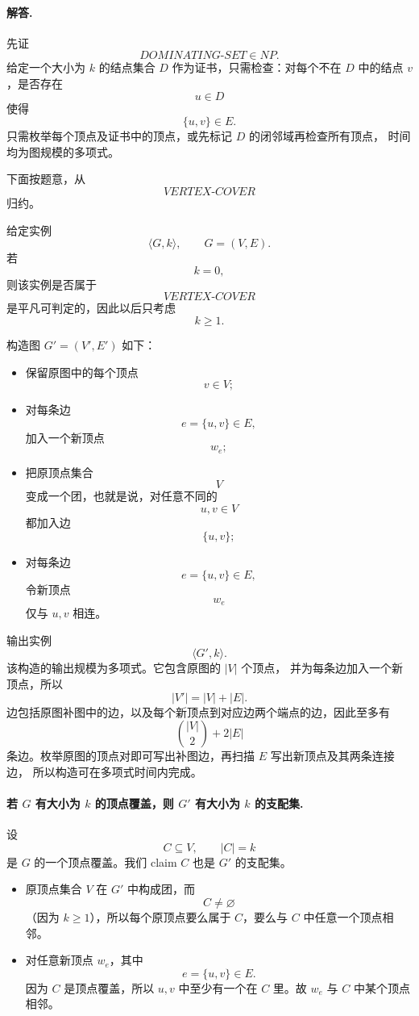 \begin{answerred}
\paragraph{解答.}
先证
\[
DOMINATING\text{-}SET\in NP.
\]
给定一个大小为 $k$ 的结点集合 $D$ 作为证书，只需检查：对每个不在 $D$ 中的结点 $v$，是否存在
\[
u\in D
\]
使得
\[
\{u,v\}\in E.
\]
只需枚举每个顶点及证书中的顶点，或先标记 $D$ 的闭邻域再检查所有顶点，
时间均为图规模的多项式。

\medskip
下面按题意，从
\[
VERTEX\text{-}COVER
\]
归约。

给定实例
\[
\langle G,k\rangle,
\qquad
G=(V,E).
\]
若
\[
k=0,
\]
则该实例是否属于
\[
VERTEX\text{-}COVER
\]
是平凡可判定的，因此以后只考虑
\[
k\ge 1.
\]

\medskip
构造图 $G'=(V',E')$ 如下：

\begin{itemize}
  \item 保留原图中的每个顶点
  \[
  v\in V;
  \]
  \item 对每条边
  \[
  e=\{u,v\}\in E,
  \]
  加入一个新顶点
  \[
  w_e;
  \]
  \item 把原顶点集合
  \[
  V
  \]
  变成一个团，也就是说，对任意不同的
  \[
  u,v\in V
  \]
  都加入边
  \[
  \{u,v\};
  \]
  \item 对每条边
  \[
  e=\{u,v\}\in E,
  \]
  令新顶点
  \[
  w_e
  \]
  仅与 $u,v$ 相连。
\end{itemize}

输出实例
\[
\langle G',k\rangle.
\]
该构造的输出规模为多项式。它包含原图的 $|V|$ 个顶点，
并为每条边加入一个新顶点，所以
\[
|V'|=|V|+|E|.
\]
边包括原图补图中的边，以及每个新顶点到对应边两个端点的边，因此至多有
\[
\binom{|V|}{2}+2|E|
\]
条边。枚举原图的顶点对即可写出补图边，再扫描 $E$ 写出新顶点及其两条连接边，
所以构造可在多项式时间内完成。

\paragraph{若 \(G\) 有大小为 \(k\) 的顶点覆盖，则 \(G'\) 有大小为 \(k\) 的支配集.}
设
\[
C\subseteq V,\qquad |C|=k
\]
是 $G$ 的一个顶点覆盖。我们 claim $C$ 也是 $G'$ 的支配集。

\begin{itemize}
  \item 原顶点集合 $V$ 在 $G'$ 中构成团，而
  \[
  C\ne\varnothing
  \]
  （因为 $k\ge1$），所以每个原顶点要么属于 $C$，要么与 $C$ 中任意一个顶点相邻。
  \item 对任意新顶点 $w_e$，其中
  \[
  e=\{u,v\}\in E.
  \]
  因为 $C$ 是顶点覆盖，所以 $u,v$ 中至少有一个在 $C$ 里。故 $w_e$ 与 $C$ 中某个顶点相邻。
\end{itemize}


\end{answerred}
